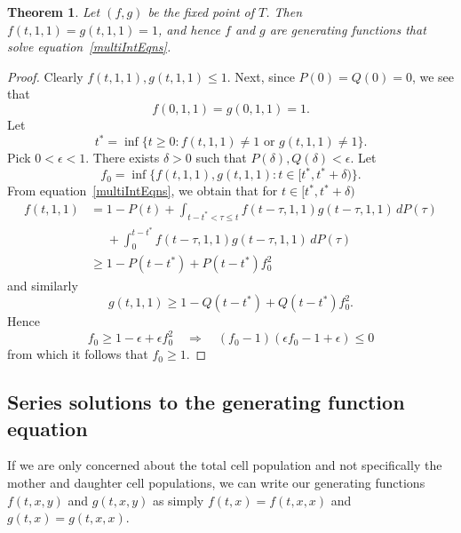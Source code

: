 \documentclass[12pt]{amsart}
\theoremstyle{plain}
\newtheorem{thm}{Theorem}[section]
\theoremstyle{definition}
\theoremstyle{remark}
\theoremstyle{definition}
\begin{document}
\begin{thm} Let $(f,g)$ be the fixed point of $T$.  Then $f(t,1,1) = g(t,1,1) = 1$, and hence $f$ and $g$ are generating functions that solve equation~\eqref{multiIntEqns}.
\end{thm}

\begin{proof}
Clearly $f(t,1,1), g(t,1,1) \le 1$.  Next, since $P(0) = Q(0) = 0$, we see that
\begin{equation}
f(0,1,1) = g(0,1,1) = 1 .
\end{equation}
Let
\begin{equation}
t^* = \inf\{t \ge 0 : f(t,1,1) \ne 1 \text{ or } g(t,1,1) \ne 1 \}.
\end{equation}
Pick $0 < \epsilon < 1$.  There exists $\delta > 0$ such that
$P(\delta), Q(\delta) < \epsilon$.
Let
\begin{equation}
f_0 = \inf \{ f(t,1,1), g(t,1,1) : t \in [t^*,t^*+\delta) \} .
\end{equation}
From equation~\eqref{multiIntEqns}, we obtain that for $t \in [t^*,t^*+\delta)$
\begin{equation}
\begin{aligned}
f(t,1,1) &= 1-P(t) + \int_{t-t^* < \tau \le t} f(t-\tau,1,1) g(t-\tau,1,1) \, dP(\tau)
\\ & \phantom{{}\ge{}} + \int_0^{t-t^*} f(t-\tau,1,1) g(t-\tau,1,1) \, dP(\tau)
\\ &\ge 1 - P(t-t^*) + P(t-t^*) f_0^2
\end{aligned}
\end{equation}
and similarly
\begin{equation}
g(t,1,1) \ge 1 - Q(t-t^*) + Q(t-t^*) f_0^2.
\end{equation}
Hence
\begin{equation}
f_0 \ge 1 - \epsilon + \epsilon f_0^2 \quad \Rightarrow \quad (f_0-1)(\epsilon f_0 - 1 + \epsilon) \le 0
\end{equation}
from which it follows that $f_0 \ge 1$.
\end{proof}

\subsection{Series solutions to the generating function equation} \label{multiSeriesSoln}

If we are only concerned about the total cell population and not specifically the mother and daughter cell populations, we can write our generating functions $f(t,x,y)$ and $g(t,x,y)$ as simply $f(t,x) = f(t,x,x)$ and $g(t,x) = g(t,x,x)$. 
\end{document}
